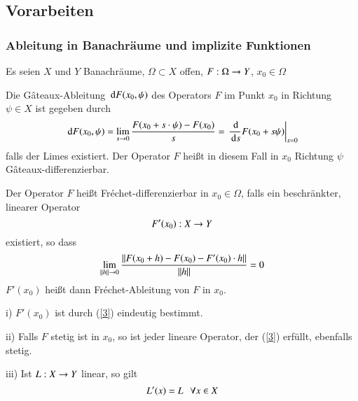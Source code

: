 \subsection{Vorarbeiten}

\subsubsection{Ableitung in Banachräume und implizite Funktionen}

Es seien $X$ und $Y$ Banachräume, $\Omega\subset X$ offen, $F:\Omega \rightarrow Y$, $x_0\in \Omega$

\begin{defi}
    Die Gâteaux-Ableitung $\, \mathrm{d} F(x_0,\psi)$ des Operators $F$ im Punkt $x_0$ in Richtung $\psi\in X$ 
    ist gegeben durch 
    \[
        \, \mathrm{d} F (x_0,\psi)=\lim_{s\rightarrow 0} \frac{F(x_0+s\cdot \psi)-F(x_0)}{s}= \left. \frac{\, \mathrm{d}}{\, \mathrm{d} s} 
        F(x_0+s\psi)\right|_{s=0}
    \]
    falls der Limes existiert. Der Operator $F$ heißt in diesem Fall in $x_0$ Richtung $\psi$ 
    Gâteaux-differenzierbar.
\end{defi}
\begin{defi}
    Der Operator $F$ heißt Fréchet-differenzierbar in $x_0\in \Omega$, falls ein beschränkter,
    linearer Operator 
    \[
        F'(x_0):X\rightarrow Y 
    \]
    existiert, so dass 
    \begin{align}\label{3}
        \lim_{\|h\|\rightarrow 0} \frac{\| F(x_0+h) - F(x_0) -F'(x_0)\cdot h \|  }{\|h\|} = 0
    \end{align}
    $F'(x_0)$ heißt dann Fréchet-Ableitung von $F$ in $x_0$.
\end{defi}

\begin{theorem}
    \begin{description}
        \item{i)} $F'(x_0)$ ist durch (\ref{3}) eindeutig bestimmt.
        \item{ii)} Falls $F$ stetig ist in $x_0$, so ist jeder lineare Operator, der (\ref{3}) erfüllt,
                ebenfalls stetig.
        \item{iii)} Ist $L:X\rightarrow Y$ linear, so gilt
                \[
                    L'(x)=L \hspace{.25cm} \forall x\in X
                \]
    \end{description}
\end{theorem}

